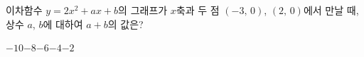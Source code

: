 이차함수 $y=2x^2+ax+b$의 그래프가 $x$축과 두 점 $(-3,\,0)$, $(2,\,0)$에서 만날 때, 상수 $a$, $b$에 대하여 $a+b$의 값은?
\begin{choices32}{$-10$}{$-8$}{$-6$}{$-4$}{$-2$}\end{choices32}
